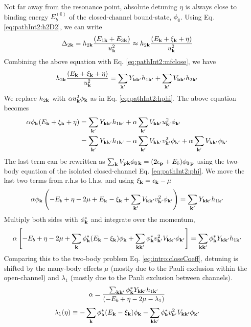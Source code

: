 Not far away from the resonance point, absolute detuning $\eta$ is always close to binding energy $E_{b}^{(0)}$ of the closed-channel bound-state, $\phi_{0}$.   
Using Eq. \ref{eq:pathInt2:h2D2}, we can write 
\begin{equation*}
\Delta_{2\mathbf{k}}=h_{2\mathbf{k}}\frac{(E_{1\mathbf{k}}+E_{3\mathbf{k}})}{u_{\mathbf{k}}^{2}}\approx{}h_{2\mathbf{k}}\frac{(E_{\mathbf{k}}+\xi_{\mathbf{k}}+\eta)}{u_{\mathbf{k}}^{2}}
\end{equation*}
Combining the above equation with Eq. \ref{eq:pathInt2:mfclose}, we have 
\begin{equation*}
h_{2\mathbf{k}}\frac{(E_{\mathbf{k}}+\xi_{\mathbf{k}}+\eta)}{u_{\mathbf{k}}^{2}}=\sum_{\mathbf{k}'}{}Y_{\mathbf{k}\mathbf{k}'}h_{1\mathbf{k}'}+\sum_{\mathbf{k}'}V_{\mathbf{k}\mathbf{k}'}h_{2\mathbf{k}'}
\end{equation*}
We replace $h_{2\mathbf{k}}$ with $\alpha{}u_{\mathbf{k}}^{2}\phi_{\mathbf{k}}$ as in Eq. \ref{eq:pathInt2:hphi}.  The above equation becomes
\begin{align*}
\alpha{}\phi_{\mathbf{k}}{(E_{\mathbf{k}}+\xi_{\mathbf{k}}+\eta)}
	&=\sum_{\mathbf{k}'}{}Y_{\mathbf{k}\mathbf{k}'}h_{1\mathbf{k}'}+\alpha{}\sum_{\mathbf{k}'}V_{\mathbf{k}\mathbf{k}'}u_{\mathbf{k}'}^{2}\phi_{\mathbf{k}'}\\
	&=\sum_{\mathbf{k}'}{}Y_{\mathbf{k}\mathbf{k}'}h_{1\mathbf{k}'}-\alpha{}\sum_{\mathbf{k}'}V_{\mathbf{k}\mathbf{k}'}v_{\mathbf{k}'}^{2}\phi_{\mathbf{k}'}
		+\alpha{}\sum_{\mathbf{k}'}V_{\mathbf{k}\mathbf{k}'}\phi_{\mathbf{k}'}
\end{align*}
The last term can be rewritten as $\sum_{\mathbf{k}}V_{\mathbf{p}\mathbf{k}} \phi_{0\,\mathbf{k}}=(2\epsilon_{\mathbf{p}}+E_{b})\phi_{0\,\mathbf{p}}$ using the two-body \sch equation of the isolated closed-channel Eq. \ref{eq:pathInt2:phi}.  We move the last two terms from r.h.s to l.h.s, and using $\xi_{\mathbf{k}}=\epsilon_{\mathbf{k}}-\mu$
\begin{equation*}
\alpha{}\phi_{\mathbf{k}}\left(-E_{b}+\eta-2\mu+E_{\mathbf{k}}-\xi_{\mathbf{k}}+\sum_{\mathbf{k}'}V_{\mathbf{k}\mathbf{k}'}v_{\mathbf{k}'}^{2}\phi_{\mathbf{k}'}\right)
=\sum_{\mathbf{k}'}{}Y_{\mathbf{k}\mathbf{k}'}h_{1\mathbf{k}'}\end{equation*}
Multiply both sides with $\phi^{*}_{\mathbf{k}}$ and integrate over the momentum,
\begin{equation}
\alpha\left[-E_{b}+\eta-2\mu+\sum_{\mathbf{k}}{\phi_{\mathbf{k}}^{*}}{(E_{\mathbf{k}}-\xi_{\mathbf{k}})}\phi_{\mathbf{k}}
	+\sum_{\mathbf{k}\mathbf{k}'}{\phi_{\mathbf{k}}^{*}}{v_{\mathbf{k}'}^{2}V_{\mathbf{k}\mathbf{k}'}}\phi_{\mathbf{k}'}\right]
	=\sum_{\mathbf{k}\mathbf{k}'}{\phi_{\mathbf{k}}^{*}}{Y_{\mathbf{k}\mathbf{k}'}}{h_{1\mathbf{k}'}}
\end{equation}
Comparing this to the two-body problem Eq. \ref{eq:intro:closeCoeff}, detuning is shifted by the many-body effects $\mu$ (mostly due to the Pauli exclusion within the open-channel) and $\lambda_{1}$ (mostly due to the Pauli exclusion between channels).  
\begin{equation}\label{eq:pathInt2:alpha}
\alpha=\frac{\sum_{\mathbf{k}\mathbf{k}'}{\phi_{\mathbf{k}}^{*}}{Y_{\mathbf{k}\mathbf{k}'}}{h_{1\mathbf{k}'}}}{\left(-E_{b}+\eta-2\mu-\lambda_{1}\right)}
\end{equation}
\begin{equation}\label{eq:pathInt2:lambda1}
\lambda_{1}(\eta)\equiv-\sum_{\mathbf{k}}{\phi_{\mathbf{k}}^{*}}{(E_{\mathbf{k}}-\xi_{\mathbf{k}})}\phi_{\mathbf{k}}
	-\sum_{\mathbf{k}\mathbf{k}'}{\phi_{\mathbf{k}}^{*}}{v_{\mathbf{k}'}^{2}V_{\mathbf{k}\mathbf{k}'}}\phi_{\mathbf{k}'}
\end{equation}

